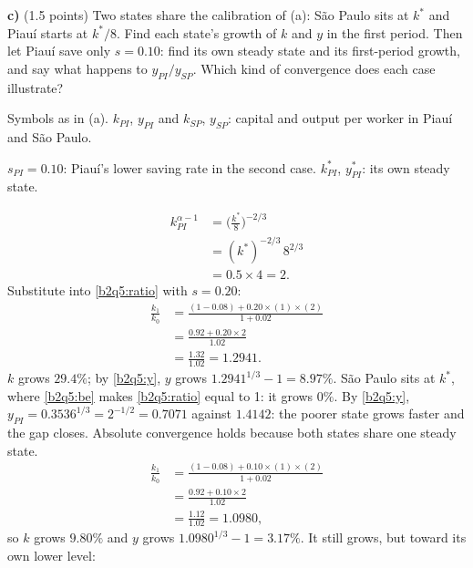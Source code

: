 \textbf{c)} (1.5 points) Two states share the calibration of (a): S\~ao Paulo sits at $k^*$ and Piau\'i starts at $k^*/8$. Find each state's growth
of $k$ and $y$ in the first period. Then let Piau\'i save only $s=0.10$: find its own steady state and its first-period growth, and say what
happens to $y_{PI}/y_{SP}$. Which kind of convergence does each case illustrate?
\resolespaco
\begin{sol}
\begin{notacao}
\item Symbols as in (a). $k_{PI}$, $y_{PI}$ and $k_{SP}$, $y_{SP}$: capital and output per worker in Piau\'i and S\~ao Paulo.
\item $s_{PI}=0.10$: Piau\'i's lower saving rate in the second case. $k^*_{PI}$, $y^*_{PI}$: its own steady state.
\end{notacao}
\begin{align*}
k_{PI}^{\alpha-1}&=\Big(\frac{k^*}{8}\Big)^{-2/3}\\
&=(k^*)^{-2/3}\,8^{2/3}\\
&=0.5\times4=2 .
\end{align*}
Substitute into \eqref{b2q5:ratio} with $s=0.20$:
\begin{align*}
\frac{k_1}{k_0}&=\frac{(1-0.08)+0.20\times(1)\times(2)}{1+0.02}\\
&=\frac{0.92+0.20\times2}{1.02}\\
&=\frac{1.32}{1.02}=1.2941 .
\end{align*}
$k$ grows $29.4\%$; by \eqref{b2q5:y}, $y$ grows $1.2941^{1/3}-1=8.97\%$. S\~ao Paulo sits at $k^*$, where \eqref{b2q5:be} makes
\eqref{b2q5:ratio} equal to 1: it grows $0\%$. By \eqref{b2q5:y}, $y_{PI}=0.3536^{1/3}=2^{-1/2}=0.7071$ against $1.4142$: the poorer state
grows faster and the gap closes. Absolute convergence holds because both states share one steady state.
\begin{align*}
\frac{k_1}{k_0}&=\frac{(1-0.08)+0.10\times(1)\times(2)}{1+0.02}\\
&=\frac{0.92+0.10\times2}{1.02}\\
&=\frac{1.12}{1.02}=1.0980 ,
\end{align*}
so $k$ grows $9.80\%$ and $y$ grows $1.0980^{1/3}-1=3.17\%$. It still grows, but toward its own lower level:

\end{sol}
